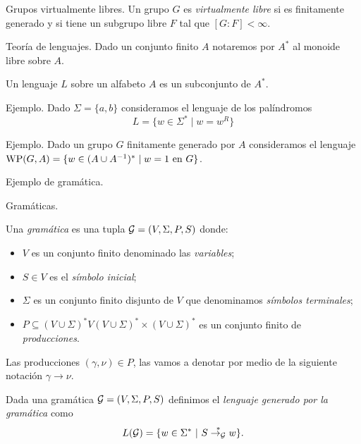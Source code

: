 \documentclass[aspectratio=169, 11pt]{beamer}
\begin{document}
	\begin{frame}[fragile]{Grupos virtualmente libres.}
		Un grupo $G$ es \emph{virtualmente libre} si es finitamente generado y si
	tiene un subgrupo libre $F$ tal que $[G:F] < \infty$.

	\end{frame}

	\begin{frame}[fragile]{Teoría de lenguajes.}
		Dado un conjunto finito $A$ notaremos por $A^*$ al monoide libre sobre $A$.
		
		\begin{deff}
			Un lenguaje $L$ sobre un alfabeto $A$ es un subconjunto de $A^*$.
		\end{deff}	
		
		\alert{Ejemplo.}
			Dado $\Sigma = \{a,b\}$ consideramos el lenguaje de los palíndromos
			\[
				L = \{ w \in \Sigma^{*} \mid w = w^{R}  \}
			\]

		\alert{Ejemplo.}
			Dado un grupo $G$ finitamente generado por $A$ consideramos el lenguaje $\text{WP}(G, A) = \{ w \in (A \cup A^{-1})^{*} \mid w = 1 \ \text{en $G$} \}$.

	\end{frame}
	
	\begin{frame}[fragile]{Ejemplo de gramática.}
	\end{frame}

	\begin{frame}[fragile]{Gramáticas.}
		\begin{deff}
			Una \emph{gramática} es una tupla ${\cal G} = (V, \Sigma, P, S)$ donde:
			\begin{itemize}
				\item $V$ es un conjunto finito denominado las \emph{variables};
				\item $S \in V$ es el \emph{símbolo inicial};
				\item $\Sigma$ es un conjunto finito disjunto de $V$ que denominamos \emph{símbolos terminales};
				\item $P \subseteq (V \cup \Sigma)^*V(V \cup \Sigma)^* \times (V \cup \Sigma)^*$ es un conjunto finito de \emph{producciones}.
			\end{itemize}
		\end{deff}

		Las producciones $(\gamma, \nu) \in P$, las vamos a denotar por medio de la siguiente notación $\gamma \to \nu$.


		\begin{deff}
			Dada una gramática ${\cal G} = (V, \Sigma, P, S)$  definimos el \emph{lenguaje generado por la gramática} como
			\[
			L({\cal G}) = \{ w \in \Sigma^* \ | \ S \overset{*}{\to_{\cal G}} w   \}.
			\]
		\end{deff}
	\end{frame}
	
\end{document}
